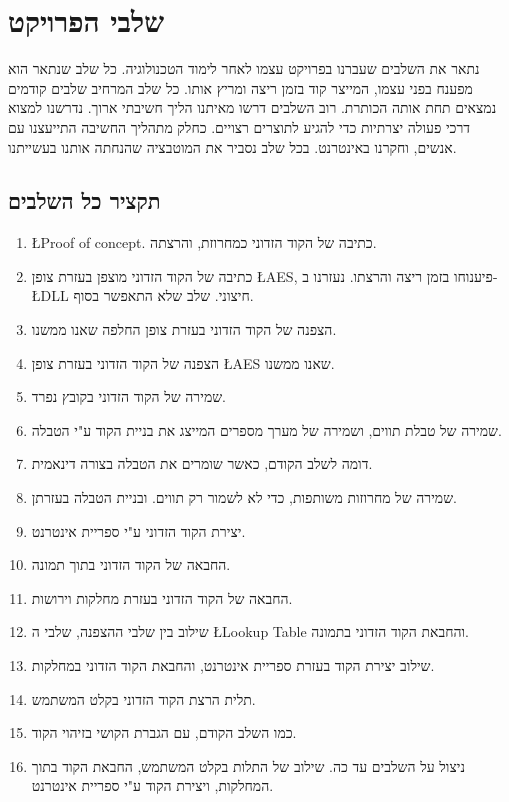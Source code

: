 \documentclass{article}
\begin{document}
		\section{שלבי הפרויקט}
			נתאר את השלבים שעברנו בפרויקט עצמו לאחר לימוד הטכנולוגיה. 
			כל שלב שנתאר הוא מפענח בפני עצמו, המייצר קוד בזמן ריצה ומריץ אותו. 
			כל שלב המרחיב שלבים קודמים נמצאים תחת אותה הכותרת. 
			רוב השלבים דרשו מאיתנו הליך חשיבתי ארוך. נדרשנו למצוא דרכי פעולה יצרתיות כדי להגיע לתוצרים רצויים. 
			כחלק מתהליך החשיבה התייעצנו עם אנשים, וחקרנו באינטרנט.
			בכל שלב נסביר את המוטבציה שהנחתה אותנו בעשייתנו.
			
			\subsection*{תקציר כל השלבים}
			\begin{enumerate}
				\item 
				\L{Proof of concept}. 
				כתיבה של הקוד הזדוני כמחרוזת, והרצתה. 
				\item 
				כתיבה של הקוד הזדוני מוצפן בעזרת צופן 
				\L{AES}, 
				פיענוחו בזמן ריצה והרצתו. 
				נעזרנו ב- 
				\L{DLL} 
				חיצוני. 
				שלב שלא התאפשר בסוף. 
				\item 
				הצפנה של הקוד הזדוני בעזרת צופן החלפה שאנו ממשנו. 
				\item 
				הצפנה של הקוד הזדוני בעזרת צופן 
				\L{AES} 
				שאנו ממשנו. 
				\item 
				שמירה של הקוד הזדוני בקובץ נפרד. 
				\item 
				שמירה של טבלת תווים, ושמירה של מערך מספרים המייצג את בניית הקוד ע"י הטבלה. 
				\item 
				דומה לשלב הקודם, כאשר שומרים את הטבלה בצורה דינאמית. 
				\item 
				שמירה של מחרוזות משותפות, כדי לא לשמור רק תווים. 
				ובניית הטבלה בעזרתן.  
				\item 
				יצירת הקוד הזדוני ע"י ספריית אינטרנט. 
				\item 
				החבאה של הקוד הזדוני בתוך תמונה. 
				\item 
				החבאה של הקוד הזדוני בעזרת מחלקות וירושות. 
				\item 
				שילוב בין שלבי ההצפנה, שלבי ה 
				\L{Lookup Table} 
				והחבאת הקוד הזדוני בתמונה. 
				\item 
				שילוב יצירת הקוד בעזרת ספריית אינטרנט, והחבאת הקוד הזדוני במחלקות. 
				\item 
				תלית הרצת הקוד הזדוני בקלט המשתמש. 
				\item 
				כמו השלב הקודם, עם הגברת הקושי בזיהוי הקוד.  
				\item 
				ניצול על השלבים עד כה. שילוב של התלות בקלט המשתמש, החבאת הקוד בתוך המחלקות, ויצירת הקוד ע"י ספריית אינטרנט. 
			\end{enumerate}
\end{document}
